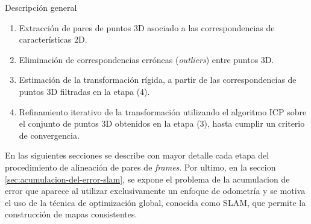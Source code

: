 \begin{section}{Descripción general}
\begin{enumerate}
\item Extracción de pares de puntos 3D asociado a las correspondencias de características 2D.

\item Eliminación de correspondencias erróneas (\textit{outliers}) entre puntos 3D.

\item Estimación de la transformación rígida, a partir de las correspondencias de puntos 3D filtradas en la etapa (4).

\item Refinamiento iterativo de la transformación utilizando el algoritmo ICP sobre el conjunto de puntos 3D obtenidos en la etapa (3), hasta cumplir un criterio de convergencia.
\end{enumerate}

En las siguientes secciones se describe con mayor detalle cada etapa del procedimiento de alineación de pares de \textit{frames}. Por ultimo, en la seccion \ref{sec:acumulacion-del-error-slam}, se expone el problema de la acumulacion de error que aparece al utilizar exclusivamente un enfoque de odometría y se motiva el uso de la técnica de optimización global, conocida como SLAM, que permite la construcción de mapas consistentes.
\end{section}
